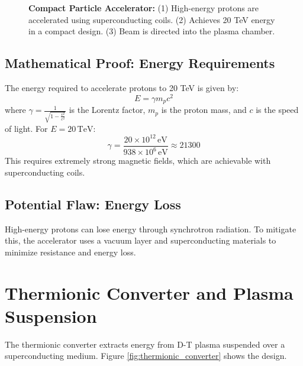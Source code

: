 \documentclass[12pt, a4paper]{article}
\begin{document}
\begin{figure}[H]
\centering
{}
\caption{
\textbf{Compact Particle Accelerator:} 
(1) High-energy protons are accelerated using superconducting coils. 
(2) Achieves 20 TeV energy in a compact design. 
(3) Beam is directed into the plasma chamber.
}
\label{fig:compact_accelerator}
\end{figure}

\subsection{Mathematical Proof: Energy Requirements}
The energy required to accelerate protons to 20 TeV is given by:
\[
E = \gamma m_p c^2
\]
where \( \gamma = \frac{1}{\sqrt{1 - \frac{v^2}{c^2}}} \) is the Lorentz factor, \( m_p \) is the proton mass, and \( c \) is the speed of light. For \( E = 20 \, \text{TeV} \):
\[
\gamma = \frac{20 \times 10^{12} \, \text{eV}}{938 \times 10^6 \, \text{eV}} \approx 21300
\]
This requires extremely strong magnetic fields, which are achievable with superconducting coils.

\subsection{Potential Flaw: Energy Loss}
High-energy protons can lose energy through synchrotron radiation. To mitigate this, the accelerator uses a vacuum layer and superconducting materials to minimize resistance and energy loss.

\section{Thermionic Converter and Plasma Suspension}
The thermionic converter extracts energy from D-T plasma suspended over a superconducting medium. Figure \ref{fig:thermionic_converter} shows the design.
\end{document}

